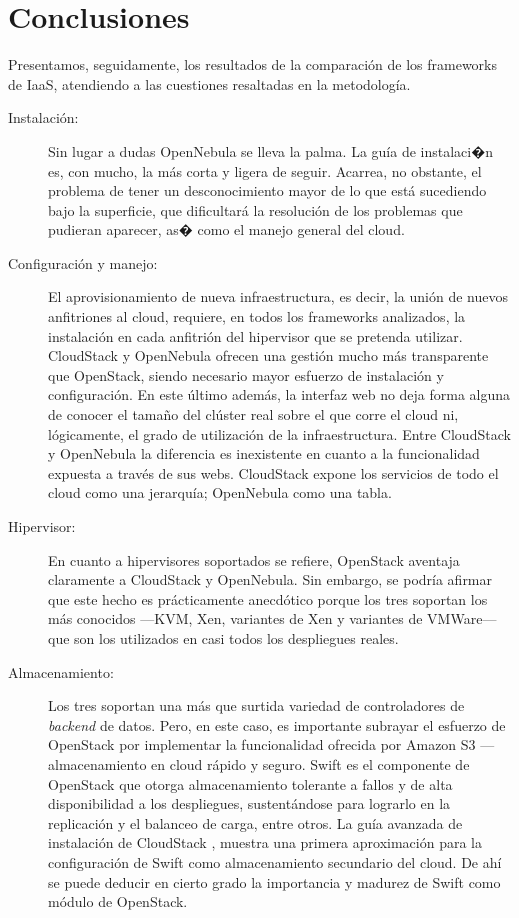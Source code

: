 \section{Conclusiones}\label{sec:conclusiones}
\noindent Presentamos, seguidamente, los resultados de la comparaci\'on de los frameworks de IaaS, atendiendo a las cuestiones resaltadas en la metodolog\'ia.
 
\begin{description}
 \item[Instalaci\'on:] Sin lugar a dudas OpenNebula se lleva la palma. La gu\'ia de instalaci�n es, con mucho, la m\'as corta y ligera de seguir. Acarrea, no obstante, el problema de tener un desconocimiento mayor de lo que est\'a sucediendo bajo la superficie, que dificultar\'a la resoluci\'on de los problemas que pudieran aparecer, as� como el manejo general del cloud.
 \item[Configuraci\'on y manejo:] El aprovisionamiento de nueva infraestructura, es decir, la uni\'on de nuevos anfitriones al cloud, requiere, en todos los frameworks analizados, la instalaci\'on en cada anfitri\'on del hipervisor que se pretenda utilizar. CloudStack y OpenNebula ofrecen una gesti\'on mucho m\'as transparente que OpenStack, siendo necesario ma\-yor esfuerzo de instalaci\'on y configuraci\'on. En este \'ultimo adem\'as, la interfaz web no deja forma alguna de conocer el tama\~no del cl\'uster real sobre el que corre el cloud ni, l\'ogicamente, el grado de utilizaci\'on de la infraestructura. Entre CloudStack y OpenNebula la diferencia es inexistente en cuanto a la funcionalidad expuesta a trav\'es de sus webs. CloudStack expone los servicios de todo el cloud como una jerarqu\'ia; OpenNebula como una tabla.
 \item[Hipervisor:] En cuanto a hipervisores soportados se refiere, OpenStack aventaja claramente a CloudStack y OpenNebula. Sin embargo, se podr\'ia afirmar que este hecho es pr\'acticamente anecd\'otico porque los tres soportan los m\'as conocidos ---KVM, Xen, variantes de Xen y variantes de VMWare--- que son los utilizados en casi todos los despliegues reales.
 \item[Almacenamiento:] Los tres soportan una m\'as que surtida variedad de controladores de \emph{backend} de datos. Pero, en este caso, es importante subrayar el esfuerzo de OpenStack por implementar la funcionalidad ofrecida por Amazon S3 ---almacenamiento en cloud r\'apido y seguro. Swift es el componente de OpenStack que otorga almacenamiento tolerante a fallos y de alta disponibilidad a los despliegues, sustent\'andose para lograrlo en la replicaci\'on y el balanceo de carga, entre otros. La gu\'ia avanzada de instalaci\'on de CloudStack \cite{cloudstackadvinstall}, muestra una primera aproximaci\'on para la configuraci\'on de Swift como almacenamiento secundario del cloud. De ah\'i se puede deducir en cierto grado la importancia y madurez de Swift como m\'odulo de OpenStack.

\end{description}
